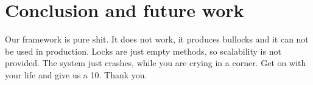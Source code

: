 \chapter{Conclusion and future work}


Our framework is pure shit. It does not work, it produces bullocks and it can not be used in production. Locks are just empty methods, so scalability is not provided. The system just crashes, while you are crying in a corner. Get on with your life and give us a 10. Thank you.